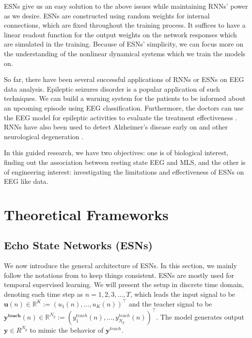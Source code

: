 \documentclass[a4paper,11pt,oneside]{article}
\begin{document}
ESNs give us an easy solution to the above issues while maintaining RNNs' power as we desire. ESNs are constructed using random weights for internal connections, which are fixed throughout the training process. It 
suffices to have a linear readout function for the output weights on the network responses which are simulated in the training.
Because of ESNs' simplicity, we can focus more on the understanding of the nonlinear dynamical systems which we train the models on.

So far, there have been several successful applications of RNNs or ESNs on EEG data analysis. Epileptic seizures disorder is a popular application of such techniques. We can build a warning system for the patients to be informed about an upcoming episode using EEG classification. Furthermore, the doctors can use the EEG model for epileptic activities to evaluate the treatment effectiveness \cite{buteneers2008real} \cite{naderi2010analysis}.  RNNs have also been used to detect Alzheimer's disease early on and other neurological degeneration  \cite{petrosian2001recurrent}\cite{ubeyli2008multiclass}. 

In this guided research, we have two objectives: one is of biological interest, finding out the association between resting state EEG and MLS,
and the other is of engineering interest: investigating the limitations and effectiveness of ESNs on EEG like data.

\section{Theoretical Frameworks}
\subsection{Echo State Networks (ESNs)}
We now introduce the general architecture of ESNs. In this section, we mainly  follow the notations from \cite{jaeger2001echo}\cite{lukovsevivcius2012practical} to keep things consistent. ESNs are mostly used for temporal supervised learning. We will present the setup in discrete time domain, denoting each time step as $ n = 1, 2, 3, \dots, T $, which leads the input signal to be $ \mathbf{u}(n) \in \mathbb{R}^K := (u_1(n), \dots, u_K(n))^\intercal$ and the teacher signal to be 
$ \mathbf{y^{teach}}(n) \in \mathbb{R}^{N_y} := (y^{teach}_1(n), \dots, y^{teach}_{N_y}(n))^\intercal$. The model generates output $\mathbf{y} \in R^{N_y}$ to mimic the behavior of $\mathbf{y}^{teach}$.
\end{document}
